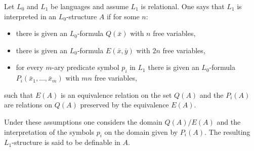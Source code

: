 Let $L_0$ and $L_1$ be languages and assume $L_1$ is relational. One says that $L_1$ is interpreted in an $L_0$-structure $A$ if for some $n$:

\begin{itemize}
\item there is given an $L_0$-formula $Q(\bar{x})$ with $n$ free variables,
\item there is given an $L_0$-formula $E(\bar{x}, \bar{y})$ with $2n$ free variables,
\item for every $m$-ary predicate symbol $p_i$ in $L_1$ there is given an $L_0$-formula $P_i(\bar{x}_1, \ldots, \bar{x}_m)$ with $mn$ free variables,
\end{itemize}

such that $E(A)$ is an equivalence relation on the set $Q(A)$ and the $P_i(A)$ are relations on $Q(A)$ preserved by the equivalence $E(A)$.

Under these assumptions one considers the domain $Q(A)/E(A)$ and the interpretation of the symbols $p_i$ on the domain given by $P_i(A)$. The resulting $L_1$-structure is said to be definable in $A$.
